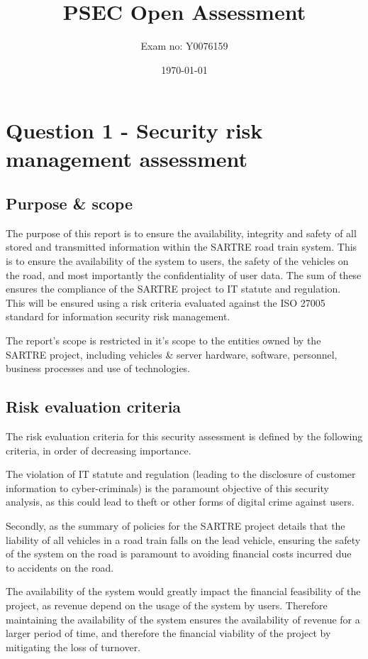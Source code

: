 \documentclass[british,11pt,a4paper]{article}
\begin{document}
\title{PSEC Open Assessment}
\author{Exam no: Y0076159}
\date{\today}
\maketitle
\tableofcontents
\clearpage


\section{Question 1 - Security risk management assessment}
\subsection{Purpose \& scope}
\label{subsec:purpose_scope}
The purpose of this report is to ensure the availability, integrity and safety of all stored and transmitted information within the SARTRE road train system. This is to ensure the availability of the system to users, the safety of the vehicles on the road, and most importantly the confidentiality of user data. The sum of these ensures the compliance of the SARTRE project to IT statute and regulation. This will be ensured using a risk criteria evaluated against the ISO 27005  standard \cite{Iso2005-nn} for information security risk management. 

The report's scope is restricted in it's scope to the entities owned by the SARTRE project, including vehicles \& server hardware, software, personnel, business processes and use of technologies. 

\subsection{Risk evaluation criteria}
The risk evaluation criteria for this security assessment is defined by the following criteria, in order of decreasing importance.

The violation of IT statute and regulation (leading to the disclosure of customer information to cyber-criminals) is the paramount objective of this security analysis, as this could lead to theft or other forms of digital crime against users. 

Secondly, as the summary of policies for the SARTRE project \cite{Davila2013-cy} details that the liability of all vehicles in a road train falls on the lead vehicle, ensuring the safety of the system on the road is paramount to avoiding financial costs incurred due to accidents on the road. 

The availability of the system would greatly impact the financial feasibility of the project, as revenue depend on the usage of the system by users. Therefore maintaining the availability of the system ensures the availability of revenue for a larger period of time, and therefore the financial viability of the project by mitigating the loss of turnover.
\end{document}
